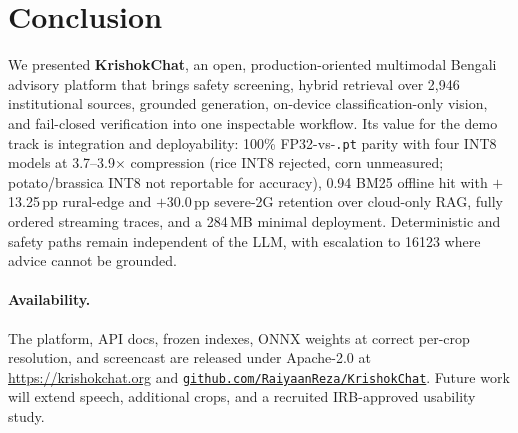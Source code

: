 \section{Conclusion}
\label{sec:conclusion}

We presented \textbf{KrishokChat}, an open, production-oriented multimodal Bengali advisory platform that brings safety screening, hybrid retrieval over 2,946 institutional sources, grounded generation, on-device classification-only vision, and fail-closed verification into one inspectable workflow. Its value for the demo track is integration and deployability: 100\% FP32-vs-{\tt .pt} parity with four INT8 models at 3.7--3.9$\times$ compression (rice INT8 rejected, corn unmeasured; potato/brassica INT8 not reportable for accuracy), 0.94 BM25 offline hit with $+$13.25\,pp rural-edge and $+$30.0\,pp severe-2G retention over cloud-only RAG, fully ordered streaming traces, and a 284\,MB minimal deployment. Deterministic and safety paths remain independent of the LLM, with escalation to 16123 where advice cannot be grounded.

\paragraph{Availability.}
{\sloppy
The platform, API docs, frozen indexes, ONNX weights at correct per-crop resolution, and screencast are released under Apache-2.0 at \url{https://krishokchat.org} and \href{https://github.com/RaiyaanReza/KrishokChat-Agricultural-Advisory-System}{\nolinkurl{github.com/RaiyaanReza/KrishokChat}}. Future work will extend speech, additional crops, and a recruited IRB-approved usability study.\par
}

